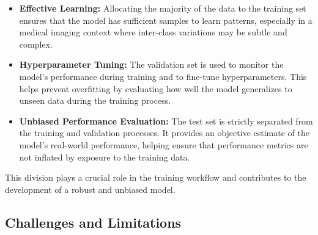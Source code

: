 \begin{itemize}
    \item \textbf{Effective Learning:} Allocating the majority of the data to the training set 
    ensures that the model has sufficient samples to learn patterns, especially in a medical imaging 
    context where inter-class variations may be subtle and complex.

    \item \textbf{Hyperparameter Tuning:} The validation set is used to monitor the model’s 
    performance during training and to fine-tune hyperparameters. This helps prevent overfitting by 
    evaluating how well the model generalizes to unseen data during the training process.

    \item \textbf{Unbiased Performance Evaluation:} The test set is strictly separated from the 
    training and validation processes. It provides an objective estimate of the model’s real-world 
    performance, helping ensure that performance metrics are not inflated by exposure to the 
    training data.
\end{itemize}

This division plays a crucial role in the training workflow and contributes to the development of a 
robust and unbiased model.
\subsection{Challenges and Limitations}

